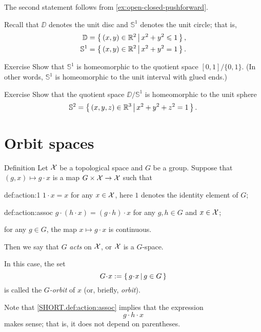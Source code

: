 The second statement follows from \ref{ex:open-closed-pushforward}.
\qeds

Recall that $\DD$ denotes the unit disc and $\mathbb{S}^1$ denotes the unit circle;
that is,
\begin{align*}
\mathbb{D}&=\left\{\,{(x,y)\in\mathbb{R}^2}\,\middle|\,{x^2+y^2\leqslant 1}\,\right\},
\\
\mathbb{S}^1&=\left\{\,{(x,y)\in\mathbb{R}^2}\,\middle|\,{x^2+y^2=1}\,\right\}.
\end{align*}

\begin{thm}{Exercise}\label{ex:[0,1]/0=1}
Show that $\mathbb{S}^1$ is homeomorphic to the quotient space $[0,1]/\{0,1\}$.
(In other words, $\mathbb{S}^1$ is homeomorphic to the unit interval with glued ends.)
\end{thm}

\begin{thm}{Exercise}\label{ex:D/S}
Show that the quotient space $\DD/\mathbb{S}^1$ is homeomorphic to the unit sphere 
\[\mathbb{S}^2=\left\{\,{(x,y,z)\in\mathbb{R}^3}\,\middle|\,{x^2+y^2+z^2=1}\,\right\}.\]
\end{thm}


\section{Orbit spaces}

\begin{thm}{Definition}\label{def:action}
Let $\mathcal{X}$ be a topological space and $G$ be a group.
Suppose that $(g,x)\mapsto g\cdot x$ is a map $G\times\mathcal{X}\to \mathcal{X}$ such that
\begin{subthm}{def:action:1}
$1\cdot x=x$ for any $x\in \mathcal{X}$, here $1$ denotes the identity element of $G$;
\end{subthm}
\begin{subthm}{def:action:assoc}
$g\cdot (h\cdot x)=(g\cdot h)\cdot x$ for any $g,h\in G$ and $x\in \mathcal{X}$;%
\end{subthm}
\begin{subthm}{}
for any $g\in G$, the map $x\mapsto g\cdot x$ is continuous.
\end{subthm}
Then we say that $G$ \emph{acts} on $\mathcal{X}$, or $\mathcal{X}$ is a $G$-space.

In this case, the set
\[G\cdot x:=\set{g\cdot x}{g\in G}\]
is called the \emph{$G$-orbit} of $x$ (or, briefly, {}\emph{orbit}).
\end{thm}

Note that \ref{SHORT.def:action:assoc} implies that the expression
\[g\cdot h\cdot x\]
makes sense; that is, it does not depend on parentheses.

